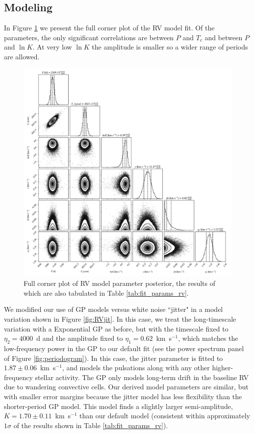 \documentclass[twocolumn]{aastex631}
\begin{document}
\subsection{Modeling}\label{sec:RVmodelingAppendix}



In Figure \ref{fig:RVcornerfull} we present the full corner plot of the RV model fit. Of the parameters, the only significant correlations are between $P$ and $T_c$ and between $P$ and $\ln K$. At very low $\ln K$ the amplitude is smaller so a wider range of periods are allowed. 


\begin{figure}[p]
    \centering
    \includegraphics[width=\linewidth]{figures/corner_mcmc_synth_full.pdf}
    \caption{Full corner plot of RV model parameter posterior, the results of which are also tabulated in Table \ref{tab:fit_params_rv}. }
    \label{fig:RVcornerfull}
\end{figure}



We modified our use of GP models versus white noise ``jitter" in a model variation shown in Figure \ref{fig:RVjit}. In this case, we treat the long-timescale variation with a Exponential GP as before, but with the timescale fixed to $\eta_2 = 4000$~d and the amplitude fixed to $\eta_1 = 0.62$~km~s$^{-1}$, which matches the low-frequency power in the GP to our default fit (see the power spectrum panel of Figure \ref{fig:periodogram}). In this case, the jitter parameter is fitted to $1.87\pm 0.06$~km~s$^{-1}$, and models the pulsations along with any other higher-frequency stellar activity. The GP only models long-term drift in the baseline RV due to wandering convective cells. Our derived model parameters are similar, but with smaller error margins because the jitter model has less flexibility than the shorter-period GP model. This model finds a slightly larger semi-amplitude, $K = 1.70\pm 0.11$~km~s$^{-1}$ than our default model (consistent within approximately $1\sigma$ of the results shown in Table \ref{tab:fit_params_rv}). 
\end{document}
